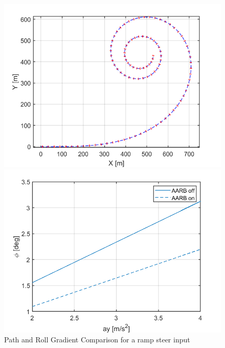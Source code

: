 \begin{figure}[H]
      \begin{minipage}[b]{0.49\linewidth}
      \centering
        \includegraphics[width=\linewidth]{Figures/4_2_path.png}
    \end{minipage} 
    \begin{minipage}[b]{0.49\linewidth}
    \centering
        \includegraphics[width=\linewidth]{Figures/4_2_rollGrad.png}
    \end{minipage} 
    \caption{Path and Roll Gradient Comparison for a ramp steer input}
\end{figure}


